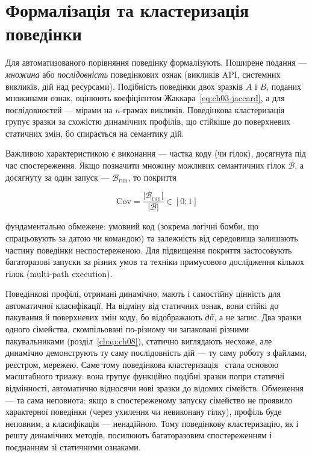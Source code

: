 \section{Формалізація та кластеризація поведінки}\label{sec:ch07-formalize}

Для автоматизованого порівняння поведінку формалізують. Поширене подання --- \emph{множина} або \emph{послідовність} поведінкових ознак (викликів API, системних викликів, дій над ресурсами). Подібність поведінки двох зразків $A$ і $B$, поданих множинами ознак, оцінюють коефіцієнтом Жаккара~\eqref{eq:ch03-jaccard}, а для послідовностей --- мірами на $n$-грамах викликів. Поведінкова кластеризація~\cite{ch07:bayer,ch07:bailey} групує зразки за схожістю динамічних профілів, що стійкіше до поверхневих статичних змін, бо спирається на семантику дій.

Важливою характеристикою є  виконання --- частка коду (чи гілок), досягнута під час спостереження. Якщо позначити множину можливих семантичних гілок $\mathcal{B}$, а досягнуту за один запуск --- $\mathcal{B}_{\text{run}}$, то покриття

\begin{equation}
\mathrm{Cov} = \frac{|\mathcal{B}_{\text{run}}|}{|\mathcal{B}|} \in [0;1]
\label{eq:ch07-coverage}
\end{equation}

фундаментально обмежене: умовний код (зокрема логічні бомби, що спрацьовують за датою чи командою) та залежність від середовища залишають частину поведінки неспостереженою. Для підвищення покриття застосовують багаторазові запуски за різних умов та техніки примусового дослідження кількох гілок (multi-path execution).

Поведінкові профілі, отримані динамічно, мають і самостійну цінність для автоматичної класифікації. На відміну від статичних ознак, вони стійкі до пакування й поверхневих змін коду, бо відображають \emph{дії}, а не запис. Два зразки одного сімейства, скомпільовані по-різному чи запаковані різними пакувальниками (розділ~\ref{chap:ch08}), статично виглядають несхоже, але динамічно демонструють ту саму послідовність дій --- ту саму роботу з файлами, реєстром, мережею. Саме тому поведінкова кластеризація~\cite{ch07:bayer} стала основою масштабного триажу: вона групує функційно подібні зразки попри статичні відмінності, автоматично відносячи нові зразки до відомих сімейств. Обмеження --- та сама неповнота: якщо в спостереженому запуску сімейство не проявило характерної поведінки (через ухилення чи невиконану гілку), профіль буде неповним, а класифікація --- ненадійною. Тому поведінкову кластеризацію, як і решту динамічних методів, посилюють багаторазовим спостереженням і поєднанням зі статичними ознаками.

